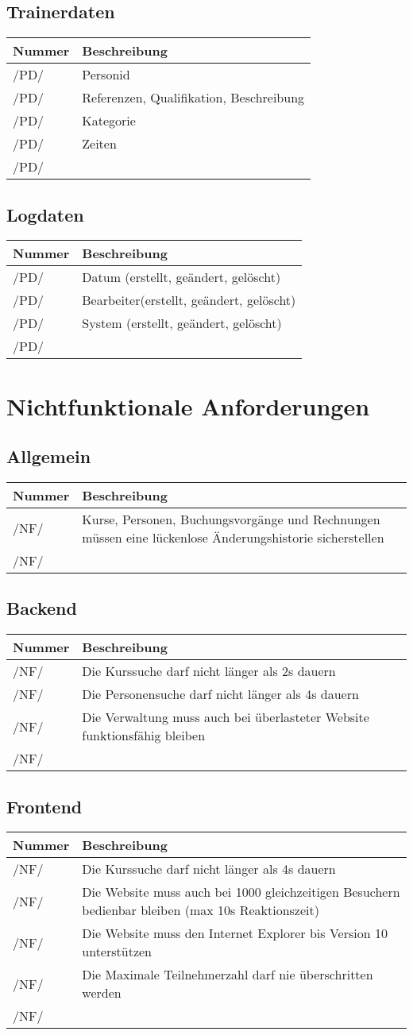 \documentclass[a4paper,12pt]{article}
\newcommand\addrow[2]{#1 &#2\\ }
\newcommand\addheading[2]{#1 &#2\\ \hline}
\newcommand\tabularhead{\begin{tabular}{lp{13cm}}
\hline
}
\newenvironment{usecase}{\tabularhead}
{\hline\end{tabular}}
\begin{document}
\subsection{Trainerdaten}
\begin{usecase}
  \addheading{Nummer}{Beschreibung} 
  \addrow{/PD/}{Personid}
  \addrow{/PD/}{Referenzen, Qualifikation, Beschreibung}
  \addrow{/PD/}{Kategorie}
  \addrow{/PD/}{Zeiten}
  \addrow{/PD/}{}
\end{usecase}

\subsection{Logdaten}
\begin{usecase}
  \addheading{Nummer}{Beschreibung} 
  \addrow{/PD/}{Datum (erstellt, geändert, gelöscht)}
  \addrow{/PD/}{Bearbeiter(erstellt, geändert, gelöscht)}
  \addrow{/PD/}{System (erstellt, geändert, gelöscht)}
  \addrow{/PD/}{}
\end{usecase}

\section{Nichtfunktionale Anforderungen}
\subsection{Allgemein}
\begin{usecase}
  \addheading{Nummer}{Beschreibung} 
  \addrow{/NF/}{Kurse, Personen, Buchungsvorgänge und Rechnungen müssen eine lückenlose Änderungshistorie sicherstellen}
  \addrow{/NF/}{}
\end{usecase}

\subsection{Backend}
\begin{usecase}
  \addheading{Nummer}{Beschreibung} 
  \addrow{/NF/}{Die Kurssuche darf nicht länger als 2s dauern}
  \addrow{/NF/}{Die Personensuche darf nicht länger als 4s dauern}
  \addrow{/NF/}{Die Verwaltung muss auch bei überlasteter Website funktionsfähig bleiben}
  \addrow{/NF/}{}
\end{usecase}

\subsection{Frontend}
\begin{usecase}
  \addheading{Nummer}{Beschreibung} 
  \addrow{/NF/}{Die Kurssuche darf nicht länger als 4s dauern}
  \addrow{/NF/}{Die Website muss auch bei 1000 gleichzeitigen Besuchern bedienbar bleiben (max 10s Reaktionszeit)}
  \addrow{/NF/}{Die Website muss den Internet Explorer bis Version 10 unterstützen}
  \addrow{/NF/}{Die Maximale Teilnehmerzahl darf nie überschritten werden}
  \addrow{/NF/}{}
\end{usecase}
\end{document}

